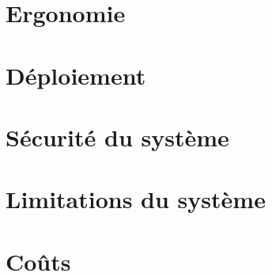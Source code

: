         \section{Ergonomie}
        \lipsum[1]
        \section{Déploiement}
        \lipsum[1]
        \section{Sécurité du système}
        \lipsum[1]
        \section{Limitations du système}
        \lipsum[1]
        \section{Coûts}
        \lipsum[1]
    
